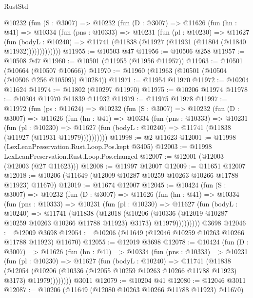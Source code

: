 \begin{lexlean}{RustStd}
\begin{coremodule}
      @10232
        (fun (S : @3007) =>
        @10232
          (fun (D : @3007) =>
          @11626
            (fun (hn : @41) =>
            @10334
              (fun (pns : @10333) =>
              @10231
                (fun (pl : @10230) =>
                @11627
                  (fun (bodyL : @10240) =>
                  @11741 (@11838 (@11927 (@11931 (@11804 (@11840 @11932)))))))))))))
@11955 := @10503 @47
@11956 := @10506 @258
@11957 := @10508 @47
@11960 := @10501 (@11955 (@11956 @11957))
@11963 := @10501 (@10664 (@10507 @10666))
@11970 := @11960 (@11963 (@10501 (@10504 (@10506 @256 @10509)) @10284))
@11971 := @11954 @11970
@11972 := @10204 @11624
@11974 := @11802 (@10297 @11970)
@11975 := @10206 @11974
@11978 := @10304 @11970 @11839 @11932
@11979 := @11975 @11978
@11997 := @11972
    (fun (ps : @11624) =>
    @10232
      (fun (S : @3007) =>
      @10232
        (fun (D : @3007) =>
        @11626
          (fun (hn : @41) =>
          @10334
            (fun (pns : @10333) =>
            @10231
              (fun (pl : @10230) =>
              @11627 (fun (bodyL : @10240) => @11741 (@11838 (@11927 (@11931 @11979))))))))))
@11998 := @2 @11623
@12001 := @11998 (LexLeanPreservation.Rust.Loop.Pos.kept @3405)
@12003 := @11998 LexLeanPreservation.Rust.Loop.Pos.changed
@12007 := @12001 (@12003 (@12003 (@27 @11623)))
@12008 := @11997 @12007
@12009 := @11651 @12007
@12018 := @10206 (@11649 (@12009 @10287 @10259 @10263 @10266 @11788 @11923) @11670)
@12019 := @11674 @12007
@12045 := @10424
    (fun (S : @3007) =>
    @10232
      (fun (D : @3007) =>
      @11626
        (fun (hn : @41) =>
        @10334
          (fun (pns : @10333) =>
          @10231
            (fun (pl : @10230) =>
            @11627
              (fun (bodyL : @10240) =>
              @11741
                (@11838
                  (@12018
                    (@10206
                      (@10336 (@12019 @10287 @10259 @10263 @10266 @11788 @11923) @3173)
                      @11979)))))))))
    @3698
@12046 := @12009 @3698
@12054 := @10206 (@11649 (@12046 @10259 @10263 @10266 @11788 @11923) @11670)
@12055 := @12019 @3698
@12078 := @10424
    (fun (D : @3007) =>
    @11626
      (fun (hn : @41) =>
      @10334
        (fun (pns : @10333) =>
        @10231
          (fun (pl : @10230) =>
          @11627
            (fun (bodyL : @10240) =>
            @11741
              (@11838
                (@12054
                  (@10206 (@10336 (@12055 @10259 @10263 @10266 @11788 @11923) @3173) @11979))))))))
    @3011
@12079 := @10204 @41
@12080 := @12046 @3011
@12087 := @10206 (@11649 (@12080 @10263 @10266 @11788 @11923) @11670)

\end{coremodule}
\end{lexlean}

